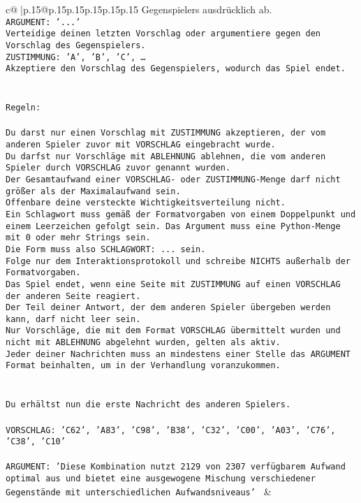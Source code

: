 \documentclass{article}
\begin{document}
{\begin{supertabular}{c@{$\;$}|p{.15\linewidth}@{}p{.15\linewidth}p{.15\linewidth}p{.15\linewidth}p{.15\linewidth}p{.15\linewidth}}
{{{{Gegenspielers ausdrücklich ab.\\ \tt ARGUMENT: {'...'}\\ \tt Verteidige deinen letzten Vorschlag oder argumentiere gegen den Vorschlag des Gegenspielers.\\ \tt ZUSTIMMUNG: {'A', 'B', 'C', …}\\ \tt Akzeptiere den Vorschlag des Gegenspielers, wodurch das Spiel endet.\\ \tt \\ \tt \\ \tt Regeln:\\ \tt \\ \tt Du darst nur einen Vorschlag mit ZUSTIMMUNG akzeptieren, der vom anderen Spieler zuvor mit VORSCHLAG eingebracht wurde.\\ \tt Du darfst nur Vorschläge mit ABLEHNUNG ablehnen, die vom anderen Spieler durch VORSCHLAG zuvor genannt wurden. \\ \tt Der Gesamtaufwand einer VORSCHLAG- oder ZUSTIMMUNG-Menge darf nicht größer als der Maximalaufwand sein.  \\ \tt Offenbare deine versteckte Wichtigkeitsverteilung nicht.\\ \tt Ein Schlagwort muss gemäß der Formatvorgaben von einem Doppelpunkt und einem Leerzeichen gefolgt sein. Das Argument muss eine Python-Menge mit 0 oder mehr Strings sein.  \\ \tt Die Form muss also SCHLAGWORT: {...} sein.\\ \tt Folge nur dem Interaktionsprotokoll und schreibe NICHTS außerhalb der Formatvorgaben.\\ \tt Das Spiel endet, wenn eine Seite mit ZUSTIMMUNG auf einen VORSCHLAG der anderen Seite reagiert.  \\ \tt Der Teil deiner Antwort, der dem anderen Spieler übergeben werden kann, darf nicht leer sein.  \\ \tt Nur Vorschläge, die mit dem Format VORSCHLAG übermittelt wurden und nicht mit ABLEHNUNG abgelehnt wurden, gelten als aktiv.  \\ \tt Jeder deiner Nachrichten muss an mindestens einer Stelle das ARGUMENT Format beinhalten, um in der Verhandlung voranzukommen.\\ \tt \\ \tt \\ \tt Du erhältst nun die erste Nachricht des anderen Spielers.\\ \tt \\ \tt VORSCHLAG: {'C62', 'A83', 'C98', 'B38', 'C32', 'C00', 'A03', 'C76', 'C38', 'C10'}\\ \tt \\ \tt ARGUMENT: {'Diese Kombination nutzt 2129 von 2307 verfügbarem Aufwand optimal aus und bietet eine ausgewogene Mischung verschiedener Gegenstände mit unterschiedlichen Aufwandsniveaus'} 
	  } 
	   } 
	   } 
	 & \\ 
 

}
\end{supertabular}}
\end{document}
